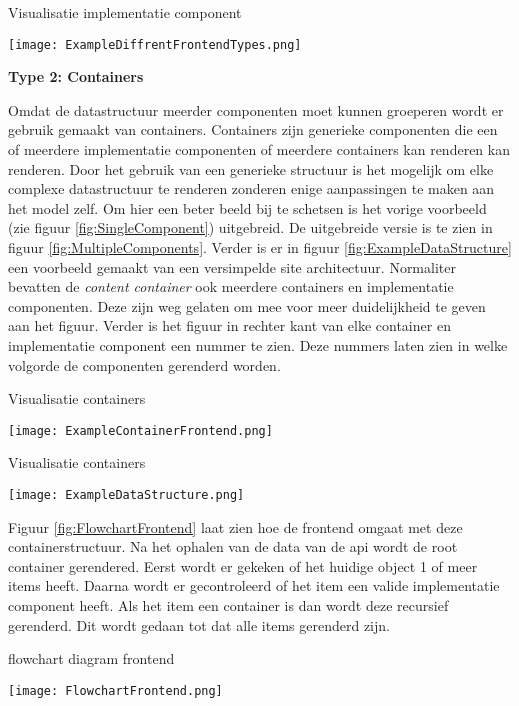 \begin{graphic}
    \captionsetup{type=figure}
    \caption{Visualisatie implementatie component}
    \texttt{[image: ExampleDiffrentFrontendTypes.png]}
    \label{fig:SingleComponent}
\end{graphic}

\whitespace[2]
\textbf{Type 2: Containers}

\whitespace
Omdat de datastructuur meerder componenten moet kunnen groeperen wordt er gebruik gemaakt van containers.
Containers zijn generieke componenten die een of meerdere implementatie componenten of meerdere containers kan renderen kan renderen.
Door het gebruik van een generieke structuur is het mogelijk om elke complexe datastructuur te renderen zonderen enige aanpassingen te maken aan het model zelf.
%
%
Om hier een beter beeld bij te schetsen is het vorige voorbeeld (zie figuur \ref{fig:SingleComponent}) uitgebreid.
De uitgebreide versie is te zien in figuur \ref{fig:MultipleComponents}.
Verder is er in figuur \ref{fig:ExampleDataStructure} een voorbeeld gemaakt van een versimpelde site architectuur.
Normaliter bevatten de \textit{content container} ook meerdere containers en implementatie componenten.
Deze zijn weg gelaten om mee voor meer duidelijkheid te geven aan het figuur.
Verder is het figuur in rechter kant van elke container en implementatie component een nummer te zien.
Deze nummers laten zien in welke volgorde de componenten gerenderd worden.

\whitespace
\begin{graphic}
    \captionsetup{type=figure}
    \caption{Visualisatie containers}
    \texttt{[image: ExampleContainerFrontend.png]}
    \label{fig:MultipleComponents}
\end{graphic}

\newpage
\whitespace
\begin{graphic}
    \captionsetup{type=figure}
    \caption{Visualisatie containers}
    \texttt{[image: ExampleDataStructure.png]}
    \label{fig:ExampleDataStructure}
\end{graphic}

\whitespace
Figuur \ref{fig:FlowchartFrontend} laat zien hoe de frontend omgaat met deze containerstructuur.
Na het ophalen van de data van de api wordt de root container gerendered.
Eerst wordt er gekeken of het huidige object 1 of meer items heeft.
Daarna wordt er gecontroleerd of het item een valide implementatie component heeft.
Als het item een container is dan wordt deze recursief gerenderd.
Dit wordt gedaan tot dat alle items gerenderd zijn.

\whitespace
\begin{graphic}
    \captionsetup{type=figure}
    \caption{flowchart diagram frontend}
    \texttt{[image: FlowchartFrontend.png]}
    \label{fig:FlowchartFrontend}
\end{graphic}
